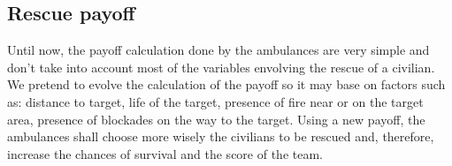 \subsection{Rescue payoff}
	\label{subsec:rescuepayoff}
	
Until now, the payoff calculation done by the ambulances are very simple and don't take into account most of the variables envolving the rescue of a civilian. We pretend to evolve the calculation of the payoff so it may base on factors such as: distance to target, life of the target, presence of fire near or on the target area, presence of blockades on the way to the target. Using a new payoff, the ambulances shall choose more wisely the civilians to be rescued and, therefore, increase the chances of survival and the score of the team.
